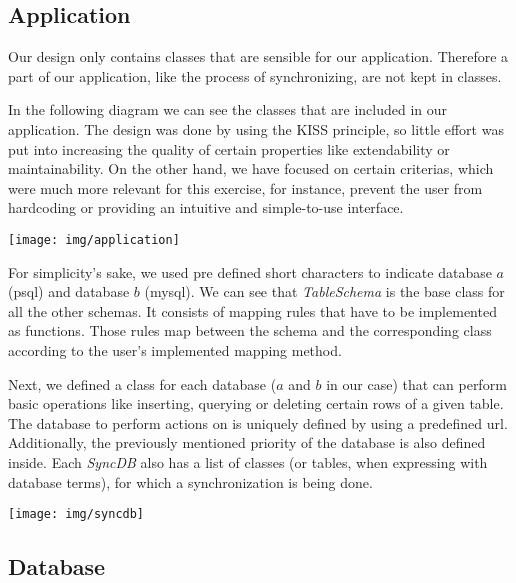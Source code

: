 \documentclass[11pt, a4paper]{article}
\begin{document}
\subsection{Application}

Our design only contains classes that are sensible for our application. Therefore a part of our application, like the process of synchronizing, are not kept in classes. 

In the following diagram we can see the classes that are included in our application. The design was done by using the KISS principle, so little effort was put into increasing the quality of certain properties like extendability or maintainability. On the other hand, we have focused on certain criterias, which were much more relevant for this exercise, for instance, prevent the user from hardcoding or providing an intuitive and simple-to-use interface. 

\begin{center}
  \texttt{[image: img/application]}
\end{center}
For simplicity's sake, we used pre defined short characters to indicate database $a$ (psql) and database $b$ (mysql). We can see that \textit{TableSchema} is the base class for all the other schemas. It consists of mapping rules that have to be implemented as functions. Those rules map between the schema and the corresponding class according to the user's implemented mapping method. 

Next, we defined a class for each database ($a$ and $b$ in our case) that can perform basic operations like inserting, querying or deleting certain rows of a given table. The database to perform actions on is uniquely defined by using a predefined url. Additionally, the previously mentioned priority of the database is also defined inside. Each \textit{SyncDB} also has a list of classes (or tables, when expressing with database terms), for which a synchronization is being done. 

\begin{center}
  \texttt{[image: img/syncdb]}
\end{center}

\subsection{Database}
\label{sec:database_design}
\end{document}
